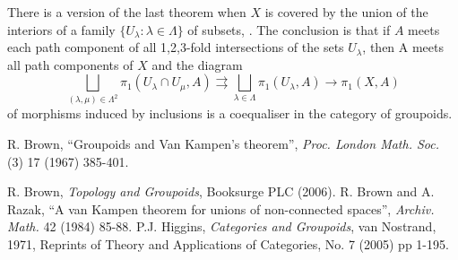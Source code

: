 \documentclass[12pt]{article}
\theoremstyle{definition}
\theoremstyle{remark}
\numberwithin{equation}{subsection}
\begin{document}
There is a version of the last theorem when $X$ is covered by the
union of the interiors of a family $\{U_\lambda : \lambda \in
\Lambda\}$ of subsets, \cite{brs}.  The conclusion is that if  $A$
meets each path component of all 1,2,3-fold intersections of the
sets $U_\lambda$, then A meets all path components of $X$ and the
diagram
$$ \bigsqcup_{(\lambda,\mu) \in \Lambda^2} \pi_1(U_\lambda \cap U_\mu, A) \rightrightarrows \bigsqcup_{\lambda \in \Lambda} \pi_1(U_\lambda, A)\rightarrow \pi_1(X,A) $$
of morphisms induced by inclusions is a coequaliser in the category
of groupoids.

\begin{thebibliography}{8}
 R. Brown, ``Groupoids and Van Kampen's theorem'', {\em Proc. London
Math. Soc.} (3)  17 (1967) 385-401.

 R. Brown, {\em Topology and Groupoids}, Booksurge PLC (2006).
 R. Brown and A. Razak, ``A van Kampen theorem for unions of
non-connected  spaces'', {\em Archiv. Math.} 42 (1984) 85-88.
 P.J. Higgins, {\em Categories and Groupoids}, van Nostrand, 1971,
Reprints of   Theory and Applications of Categories,  No. 7 (2005)
pp 1-195.

\end{thebibliography}
\end{document}
